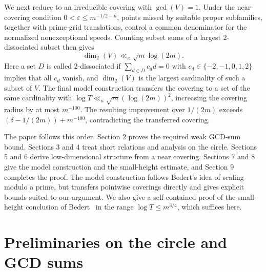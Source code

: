 \documentclass[12pt,leqno]{article}
\numberwithin{equation}{section}
\theoremstyle{remark}
\newcommand{\LRdimension}{\operatorname{dim}_2}
\begin{document}
We next reduce to an irreducible covering with $\gcd(V)=1$. Under the near-covering condition $0<\varepsilon\le m^{-1/2-\kappa}$, points missed by suitable proper subfamilies, together with prime-grid translations, control a common denominator for the normalized nonexceptional speeds. Counting subset sums of a largest $2$-dissociated subset then gives
\begin{equation}\label{eq:intro-dim}
\LRdimension(V)\ll_\kappa \sqrt m\log(2m).
\end{equation}
Here a set $D$ is called $2$-dissociated if $\sum_{d\in D}c_dd=0$ with $c_d\in\{-2,-1,0,1,2\}$ implies that all $c_d$ vanish, and $\LRdimension(V)$ is the largest cardinality of such a subset of $V$. The final model construction transfers the covering to a set of the same cardinality with $\log T\ll_\kappa\sqrt m(\log(2m))^2$, increasing the covering radius by at most $m^{-100}$. The resulting improvement over $1/(2m)$ exceeds $(\delta-1/(2m))+m^{-100}$, contradicting the transferred covering.

The paper follows this order. Section 2 proves the required weak GCD-sum bound. Sections 3 and 4 treat short relations and analysis on the circle. Sections 5 and 6 derive low-dimensional structure from a near covering. Sections 7 and 8 give the model construction and the small-height estimate, and Section 9 completes the proof. The model construction follows Bedert's idea of scaling modulo a prime, but transfers pointwise coverings directly and gives explicit bounds suited to our argument. We also give a self-contained proof of the small-height conclusion of Bedert~\cite[Proposition 2.5]{Bedert} in the range $\log T\le m^{3/4}$, which suffices here.

\section{Preliminaries on the circle and GCD sums}
\end{document}

